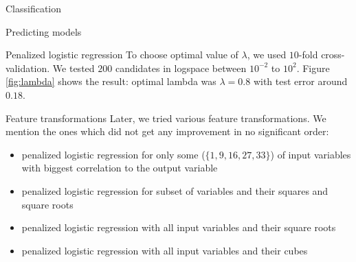\documentclass{article}
\begin{document}
\begin{section}{Classification}
\begin{subsection}{Predicting models}
\begin{subsubsection}{Penalized logistic regression}
To choose optimal value of $\lambda$, we used $10$-fold cross-validation. We tested $200$ candidates in logspace between $10^{-2}$ to $10^2$. Figure \ref{fig:lambda} shows the result: optimal lambda was $\lambda = 0.8$ with test error around $0.18$.

\begin{figure}[!t]
\center

\hfill
{}
\caption{}
\end{figure}

\begin{subsubsection}{Feature transformations}
Later, we tried various feature transformations. We mention the ones which did not get any improvement in no significant order:
\begin{itemize}

\item penalized logistic regression for only some ($\{1, 9, 16, 27, 33\}$) of input variables with biggest correlation to the output variable
\item penalized logistic regression for subset of variables and their squares and square roots
\item penalized logistic regression with all input variables and their square roots
\item penalized logistic regression with all input variables and their cubes
\end{itemize}


\end{subsubsection}
\end{subsubsection}
\end{subsection}
\end{section}
\end{document}
